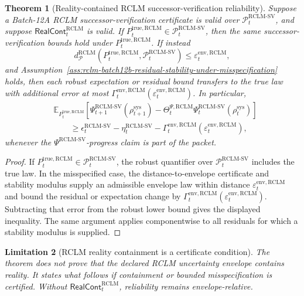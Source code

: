 \documentclass[11pt,a4paper]{article}
\newtheorem{theorem}{Theorem}[section]
\newtheorem{limitation}[theorem]{Limitation}
\newcommand{\Pcal}{\mathcal P}
\newcommand{\RCLM}{\mathrm{RCLM}}
\newcommand{\sys}{\mathrm{sys}}
\newcommand{\true}{\mathrm{true}}
\begin{document}
\begin{theorem}[Reality-contained RCLM successor-verification reliability]
\label{thm:rclm-batch12b-reality-contained-sv-reliability}
Suppose a Batch-12A RCLM successor-verification certificate is valid over \(\Pcal_t^{\RCLM\text{-}\mathrm{SV}}\), and suppose \(\mathsf{RealCont}_t^{\RCLM}\) is valid. If \(P_t^{\true,\RCLM}\in\Pcal_t^{\RCLM\text{-}\mathrm{SV}}\), then the same successor-verification bounds hold under \(P_t^{\true,\RCLM}\). If instead
\[
d_{\Pcal}^{\RCLM}(P_t^{\true,\RCLM},\Pcal_t^{\RCLM\text{-}\mathrm{SV}})
\le
\varepsilon_t^{\mathrm{env},\RCLM},
\]
and Assumption~\ref{ass:rclm-batch12b-residual-stability-under-misspecification} holds, then each robust expectation or residual bound transfers to the true law with additional error at most \(\Gamma_t^{\mathrm{env},\RCLM}(\varepsilon_t^{\mathrm{env},\RCLM})\). In particular,
\[
\begin{aligned}
&\mathbb E_{P_t^{\true,\RCLM}}
\left[
\Psi_{t+1}^{\RCLM\text{-}\mathrm{SV}}(\rho_{t+1}^{\sys})-
\Theta_t^{\Psi,\RCLM}\Psi_t^{\RCLM\text{-}\mathrm{SV}}(\rho_t^{\sys})
\right]\\
&\qquad\ge
\epsilon_t^{\RCLM\text{-}\mathrm{SV}}-
\eta_t^{\RCLM\text{-}\mathrm{SV}}-
\Gamma_t^{\mathrm{env},\RCLM}(\varepsilon_t^{\mathrm{env},\RCLM}),
\end{aligned}
\]
whenever the \(\Psi^{\RCLM\text{-}\mathrm{SV}}\)-progress claim is part of the packet.
\end{theorem}

\begin{proof}
If \(P_t^{\true,\RCLM}\in\Pcal_t^{\RCLM\text{-}\mathrm{SV}}\), the robust quantifier over \(\Pcal_t^{\RCLM\text{-}\mathrm{SV}}\) includes the true law. In the misspecified case, the distance-to-envelope certificate and stability modulus supply an admissible envelope law within distance \(\varepsilon_t^{\mathrm{env},\RCLM}\) and bound the residual or expectation change by \(\Gamma_t^{\mathrm{env},\RCLM}(\varepsilon_t^{\mathrm{env},\RCLM})\). Subtracting that error from the robust lower bound gives the displayed inequality. The same argument applies componentwise to all residuals for which a stability modulus is supplied.
\end{proof}

\begin{limitation}[RCLM reality containment is a certificate condition]
\label{lim:rclm-batch12b-reality-containment-condition}
The theorem does not prove that the declared RCLM uncertainty envelope contains reality. It states what follows if containment or bounded misspecification is certified. Without \(\mathsf{RealCont}_t^{\RCLM}\), reliability remains envelope-relative.
\end{limitation}
\end{document}
